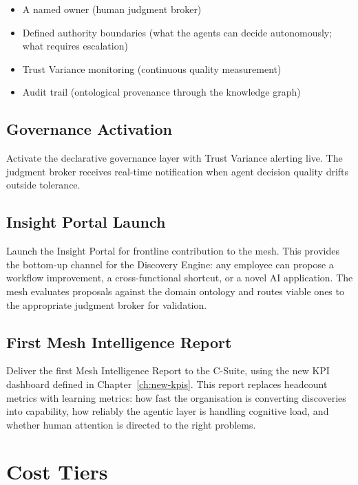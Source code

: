 \begin{itemize}
  \item A named owner (human judgment broker)
  \item Defined authority boundaries (what the agents can decide autonomously; what requires escalation)
  \item Trust Variance monitoring (continuous quality measurement)
  \item Audit trail (ontological provenance through the knowledge graph)
\end{itemize}

\subsection{Governance Activation}

Activate the declarative governance layer with Trust Variance alerting live. The judgment broker receives real-time notification when agent decision quality drifts outside tolerance.

\subsection{Insight Portal Launch}

Launch the Insight Portal for frontline contribution to the mesh. This provides the bottom-up channel for the Discovery Engine: any employee can propose a workflow improvement, a cross-functional shortcut, or a novel AI application. The mesh evaluates proposals against the domain ontology and routes viable ones to the appropriate judgment broker for validation.

\subsection{First Mesh Intelligence Report}

Deliver the first Mesh Intelligence Report to the C-Suite, using the new KPI dashboard defined in Chapter~\ref{ch:new-kpis}. This report replaces headcount metrics with learning metrics: how fast the organisation is converting discoveries into capability, how reliably the agentic layer is handling cognitive load, and whether human attention is directed to the right problems.

\section{Cost Tiers}

